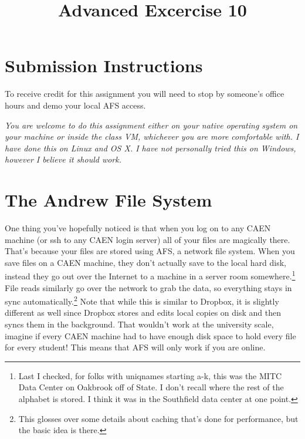 \documentclass{article}
\begin{document}
\fancyfoot[C]{\color{gray} \thepage~/~\pageref*{LastPage}}
\pagestyle{fancyplain}


\title{\textbf{Advanced Excercise 10\\}}
\author{\textbf{\color{red}{Due: Saturday, November 26, 10:00PM (Hard Deadline)}}}
\date{}
\maketitle


\section*{Submission Instructions}
To receive credit for this assignment you will need to stop by someone's
office hours and demo your local AFS access.

\emph{You are welcome to do this assignment either on your native operating
  system on your machine or inside the class VM, whichever you are more
  comfortable with. I have done this on Linux and OS X. I have not personally
  tried this on Windows, however I believe it should work.}

\section*{The Andrew File System}

One thing you've hopefully noticed is that when you log on to any CAEN machine
(or ssh to any CAEN login server) all of your files are magically there.
That's because your files are stored using AFS, a network file system. When
you save files on a CAEN machine, they don't actually save to the local hard
disk, instead they go out over the Internet to a machine in a server room
somewhere.\footnote{Last I checked, for folks with uniqnames starting a-k,
this was the MITC Data Center on Oakbrook off of State. I don't recall where
the rest of the alphabet is stored. I think it was in the Southfield data
center at one point.} File reads similarly go over the network to grab the
data, so everything stays in sync automatically.\footnote{This glosses over
  some details about caching that's done for performance, but the basic idea
  is there.} Note that while this is similar to Dropbox, it is slightly
different as well since Dropbox stores and edits local copies on disk and then
syncs them in the background. That wouldn't work at the university scale,
imagine if every CAEN machine had to have enough disk space to hold every file
for every student! This means that AFS will only work if you are online.
\end{document}

